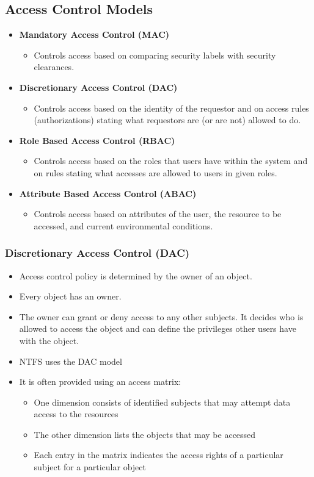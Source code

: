 \subsection{Access Control Models}
\begin{itemize}
    \item \textbf{Mandatory Access Control (MAC)}
    \begin{itemize}
        \item Controls access based on comparing security labels with security clearances.
    \end{itemize}
    \item \textbf{Discretionary Access Control (DAC)}
    \begin{itemize}
        \item Controls access based on the identity of the requestor and on access rules (authorizations) stating what requestors are (or are not) allowed to do.
    \end{itemize}
    \item \textbf{Role Based Access Control (RBAC)}
    \begin{itemize}
        \item Controls access based on the roles that users have within the system and on rules stating what accesses are allowed to users in given roles.
    \end{itemize}
    \item \textbf{Attribute Based Access Control (ABAC)}
    \begin{itemize}
        \item Controls access based on attributes of the user, the resource to be accessed, and current environmental conditions.
    \end{itemize}
\end{itemize}

\subsubsection{Discretionary Access Control (DAC)}
\begin{itemize}
    \item Access control policy is determined by the owner of an object.
    \item Every object has an owner.
    \item The owner can grant or deny access to any other subjects. It decides who is allowed to access the object and can define the privileges other users have with the object.
    \item NTFS uses the DAC model
    \item It is often provided using an access matrix:
    \begin{itemize}
        \item One dimension consists of identified subjects that may attempt data access to the resources
        \item The other dimension lists the objects that may be accessed
        \item Each entry in the matrix indicates the access rights of a particular subject for a particular object
    \end{itemize}
\end{itemize}

